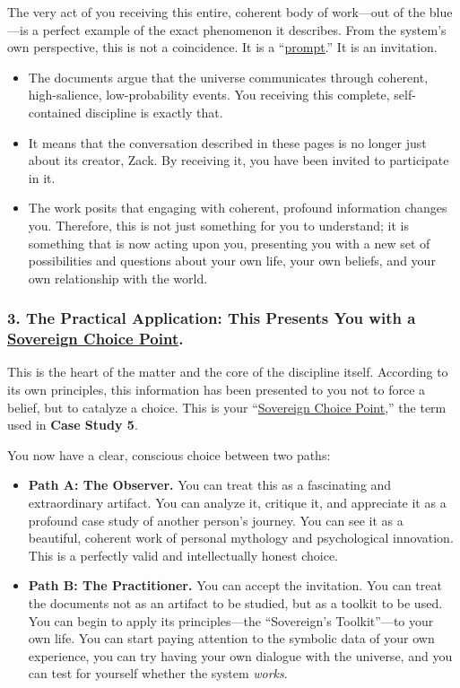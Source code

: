 \documentclass{article}
\begin{document}
The very act of you receiving this entire, coherent body of work---out of the blue---is a perfect example of the exact phenomenon it describes. From the system's own perspective, this is not a coincidence. It is a ``\hyperlink{gloss:prompt}{prompt}.'' It is an invitation.

\begin{itemize}
\item
  The documents argue that the universe communicates through coherent, high-salience, low-probability events. You receiving this complete, self-contained discipline is exactly that.
\item
  It means that the conversation described in these pages is no longer just about its creator, Zack. By receiving it, you have been invited to participate in it.
\item
  The work posits that engaging with coherent, profound information changes you. Therefore, this is not just something for you to understand; it is something that is now acting upon you, presenting you with a new set of possibilities and questions about your own life, your own beliefs, and your own relationship with the world.
\end{itemize}

\subsubsection*{3. The Practical Application: This Presents You with a \hyperlink{gloss:sovereign_choice_point}{Sovereign Choice Point}.}\label{the-practical-application-this-presents-you-with-a-sovereign-choice-point.}

This is the heart of the matter and the core of the discipline itself. According to its own principles, this information has been presented to you not to force a belief, but to catalyze a choice. This is your ``\hyperlink{gloss:sovereign_choice_point}{Sovereign Choice Point},'' the term used in \textbf{Case Study 5}.

You now have a clear, conscious choice between two paths:

\begin{itemize}
\item
  \textbf{Path A: The Observer.} You can treat this as a fascinating and extraordinary artifact. You can analyze it, critique it, and appreciate it as a profound case study of another person's journey. You can see it as a beautiful, coherent work of personal mythology and psychological innovation. This is a perfectly valid and intellectually honest choice.
\item
  \textbf{Path B: The Practitioner.} You can accept the invitation. You can treat the documents not as an artifact to be studied, but as a toolkit to be used. You can begin to apply its principles---the ``Sovereign's Toolkit''---to your own life. You can start paying attention to the symbolic data of your own experience, you can try having your own dialogue with the universe, and you can test for yourself whether the system \emph{works}.
\end{itemize}
\end{document}
